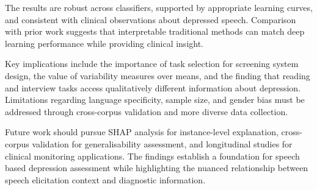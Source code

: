 The results are robust across classifiers, supported by appropriate learning curves, and consistent with clinical observations about depressed speech. Comparison with prior work suggests that interpretable traditional methods can match deep learning performance while providing clinical insight.

Key implications include the importance of task selection for screening system design, the value of variability measures over means, and the finding that reading and interview tasks access qualitatively different information about depression. Limitations regarding language specificity, sample size, and gender bias must be addressed through cross-corpus validation and more diverse data collection.

Future work should pursue SHAP analysis for instance-level explanation, cross-corpus validation for generalisability assessment, and longitudinal studies for clinical monitoring applications. The findings establish a foundation for speech based depression assessment while highlighting the nuanced relationship between speech elicitation context and diagnostic information.
